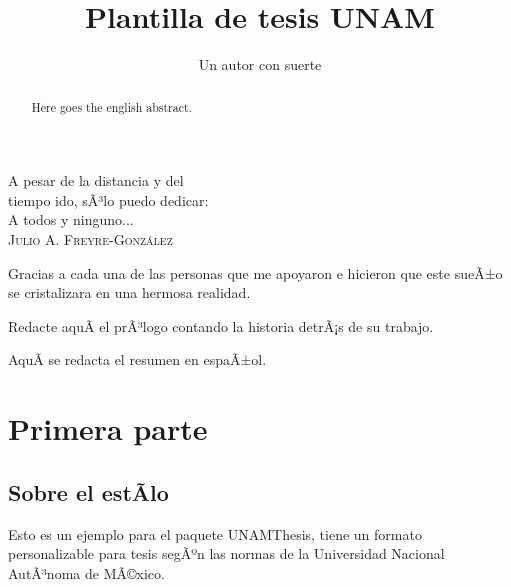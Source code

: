 \documentclass[11pt,spanish]{report}
\begin{document}
\title{Plantilla de tesis UNAM}
\author{Un autor con suerte}
\maketitle

\begin{dedication}
A pesar de la distancia y del\\
tiempo ido, sÃ³lo puedo dedicar:\\
A todos y ninguno...\\
\textsc{Julio A. Freyre-Gonz\'{a}lez}
\end{dedication}

\begin{acknowledgements}
Gracias a cada una de las personas que me apoyaron e hicieron que
este sueÃ±o se cristalizara en una hermosa realidad.
\end{acknowledgements}

\tableofcontents
\clearpage
\listoftables
\clearpage
\listoffigures
\clearpage

\begin{foreword}
Redacte aquÃ­ el prÃ³logo contando la historia detrÃ¡s de su
trabajo.
\end{foreword}

\begin{abstract}
Here goes the english abstract.
\end{abstract}

\begin{resumen}
AquÃ­ se redacta el resumen en espaÃ±ol.
\end{resumen}


\part{Primera parte}

\chapter{Sobre el estÃ­lo}

Esto es un ejemplo para el paquete UNAMThesis, tiene un formato personalizable para tesis segÃºn las normas de la Universidad Nacional AutÃ³noma de MÃ©xico.
\end{document}
